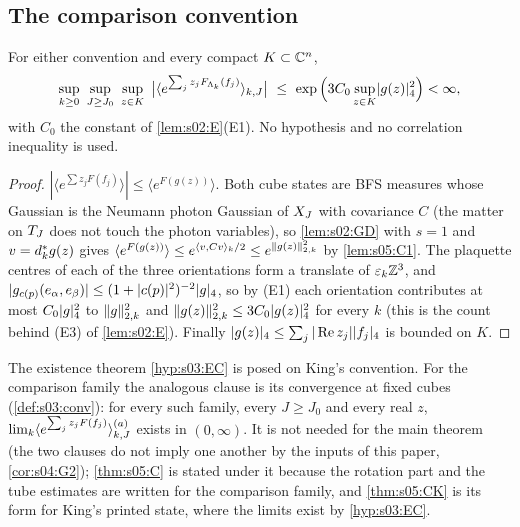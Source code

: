 \subsection{The comparison convention}

\begin{lemma}\label{lem:s05:C2}
For either convention and every compact $K\subset\mathbb C^n$,
\[
\sup_{k\ge0}\ \sup_{J\ge J_0}\ \sup_{z\in K}\ \big|\langle e^{\sum_jz_jF_{\Lk}(f_j)}\rangle_{k,J}\big|\ \le\ \exp\Big(3C_0\sup_{z\in K}\fournorm{g(z)}^2\Big)<\infty,
\]
with $C_0$ the constant of \cref{lem:s02:E}\textup{(E1)}. No hypothesis and no correlation inequality is used.
\end{lemma}

\begin{proof}
$|\langle e^{\sum z_jF(f_j)}\rangle|\le\langle e^{F(g(z))}\rangle$. Both cube states are BFS measures whose Gaussian is the Neumann photon Gaussian of $X_J$ with covariance $C$ (the matter on $T_J$ does not touch the photon variables), so \cref{lem:s02:GD} with $s=1$ and $v=d^{*}_kg(z)$ gives $\langle e^{F(g(z))}\rangle\le e^{\langle v,Cv\rangle_k/2}\le e^{\lVert g(z)\rVert^2_{2,k}}$ by \cref{lem:s05:C1}. The plaquette centres of each of the three orientations form a translate of $\varepsilon_k\mathbb Z^3$, and $|g_{c(p)}(e_\alpha,e_\beta)|\le(1+|c(p)|^2)^{-2}\lvert g\rvert_{4}$, so by (E1) each orientation contributes at most $C_0\lvert g\rvert_{4}^2$ to $\lVert g\rVert^2_{2,k}$ and $\lVert g(z)\rVert^2_{2,k}\le3C_0\lvert g(z)\rvert_{4}^2$ for every $k$ (this is the count behind (E3) of \cref{lem:s02:E}). Finally $\lvert g(z)\rvert_{4}\le\sum_j|\operatorname{Re} z_j|\lvert f_j\rvert_{4}$ is bounded on $K$.
\end{proof}

The existence theorem \cref{hyp:s03:EC} is posed on King's convention. For the comparison family the analogous clause is its convergence at fixed cubes (\cref{def:s03:conv}): for every such family, every $J\ge J_0$ and every real $z$, $\lim_k\langle e^{\sum_jz_jF(f_j)}\rangle^{(a)}_{k,J}$ exists in $(0,\infty)$. It is not needed for the main theorem (the two clauses do not imply one another by the inputs of this paper, \cref{cor:s04:G2}); \cref{thm:s05:C} is stated under it because the rotation part and the tube estimates are written for the comparison family, and \cref{thm:s05:CK} is its form for King's printed state, where the limits exist by \cref{hyp:s03:EC}.

